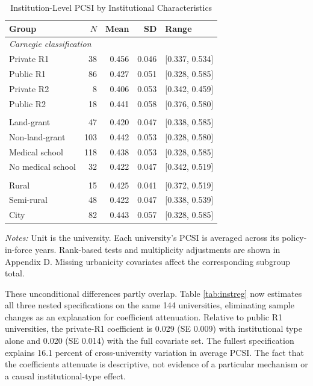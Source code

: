 \documentclass[11pt]{article}
\begin{document}
\begin{table}[htbp]\centering\caption{Institution-Level PCSI by Institutional Characteristics}\label{tab:groups}\small\begin{tabular}{lrrrl}\toprule Group&$N$&Mean&SD&Range\\\midrule
\multicolumn{5}{l}{\textit{Carnegie classification}}\\Private R1&38&0.456&0.046&[0.337, 0.534]\\Public R1&86&0.427&0.051&[0.328, 0.585]\\Private R2&8&0.406&0.053&[0.342, 0.459]\\Public R2&18&0.441&0.058&[0.376, 0.580]\\\addlinespace
\multicolumn{5}{l}{\textit{Mission and program characteristics}}\\Land-grant&47&0.420&0.047&[0.338, 0.585]\\Non-land-grant&103&0.442&0.053&[0.328, 0.580]\\Medical school&118&0.438&0.053&[0.328, 0.585]\\No medical school&32&0.422&0.047&[0.342, 0.519]\\\addlinespace
\multicolumn{5}{l}{\textit{Urbanicity}}\\Rural&15&0.425&0.041&[0.372, 0.519]\\Semi-rural&48&0.422&0.047&[0.338, 0.539]\\City&82&0.443&0.057&[0.328, 0.585]\\\bottomrule\end{tabular}
\par\smallskip\begin{minipage}{.89\linewidth}\footnotesize\emph{Notes:} Unit is the university. Each university's PCSI is averaged across its policy-in-force years. Rank-based tests and multiplicity adjustments are shown in Appendix D. Missing urbanicity covariates affect the corresponding subgroup total.\end{minipage}\end{table}

These unconditional differences partly overlap. Table \ref{tab:instreg} now estimates all three nested specifications on the same 144 universities, eliminating sample changes as an explanation for coefficient attenuation. Relative to public R1 universities, the private-R1 coefficient is 0.029 (SE 0.009) with institutional type alone and 0.020 (SE 0.014) with the full covariate set. The fullest specification explains 16.1 percent of cross-university variation in average PCSI. The fact that the coefficients attenuate is descriptive, not evidence of a particular mechanism or a causal institutional-type effect.
\end{document}
